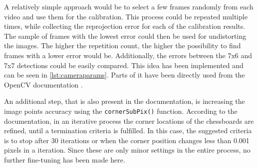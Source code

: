 A relatively simple approach would be to select a few frames randomly from each video and use them for the calibration. This process could be repeated multiple times, while collecting the reprojection error for each of the calibration results. The sample of frames with the lowest error could then be used for undistorting the images. The higher the repetition count, the higher the possibility to find frames with a lower error would be. Additionally, the errors between the 7x6 and 7x7 detections could be easily compared. This idea has been implemented and can be seen in \autoref{lst:cameraparams}. Parts of it have been directly used from the OpenCV documentation \cite{cv_cctut}.

An additional step, that is also present in the documentation, is increasing the image points accuracy using the \texttt{cornerSubPix()} function. According to the documentation, in an iterative process the corner locations of the chessboards are refined, until a termination criteria is fulfilled. In this case, the suggested criteria is to stop after 30 iterations or when the corner position changes less than 0.001 pixels in a iteration. Since these are only minor settings in the entire process, no further fine-tuning has been made here. \cite{cv_corner}

